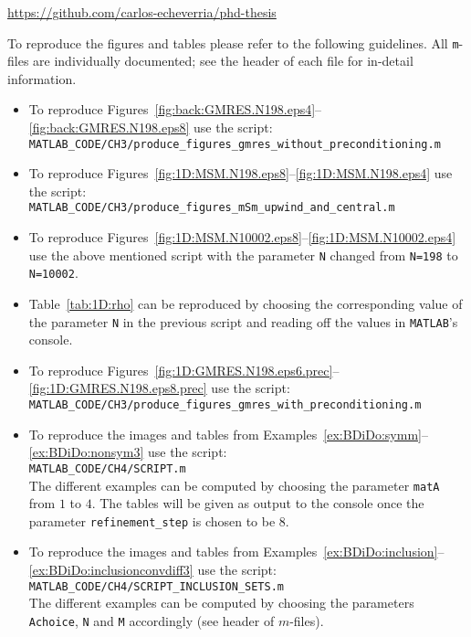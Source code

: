 \documentclass[
  twoside,
  BCOR=12mm,
  openany,
]{scrbook} %
\begin{document}
\begin{center}\url{https://github.com/carlos-echeverria/phd-thesis} \end{center}

\noindent To reproduce the figures and tables please refer to the following guidelines. All \texttt{m}-files are individually documented; see the header of each file for in-detail information.
\begin{itemize}
\item To reproduce Figures~\ref{fig:back:GMRES.N198.eps4}--\ref{fig:back:GMRES.N198.eps8} use the script:\\
\medskip
\texttt{MATLAB\_CODE/CH3/produce\_figures\_gmres\_without\_preconditioning.m}
\item To reproduce Figures~\ref{fig:1D:MSM.N198.eps8}--\ref{fig:1D:MSM.N198.eps4} use the script:\\
\medskip
\texttt{MATLAB\_CODE/CH3/produce\_figures\_mSm\_upwind\_and\_central.m}
\item To reproduce Figures~\ref{fig:1D:MSM.N10002.eps8}--\ref{fig:1D:MSM.N10002.eps4} use the above mentioned script with the parameter \texttt{N} changed from \texttt{N=198} to \texttt{N=10002}.
\item Table~\ref{tab:1D:rho} can be reproduced by choosing the corresponding value of the parameter \texttt{N} in the previous script and reading off the values in \texttt{MATLAB}'s console.
\item To reproduce Figures~\ref{fig:1D:GMRES.N198.eps6.prec}--\ref{fig:1D:GMRES.N198.eps8.prec} use the script:\\
\medskip
\texttt{MATLAB\_CODE/CH3/produce\_figures\_gmres\_with\_preconditioning.m}
\item To reproduce the images and tables from Examples~\ref{ex:BDiDo:symm}--\ref{ex:BDiDo:nonsym3} use the script:\\
\medskip
\texttt{MATLAB\_CODE/CH4/SCRIPT.m}\\
The different examples can be computed by choosing the parameter \texttt{matA} from $1$ to $4$. The tables will be given as output to the console once the parameter \texttt{refinement\_step} is chosen to be $8$.
\item To reproduce the images and tables from Examples~\ref{ex:BDiDo:inclusion}--\ref{ex:BDiDo:inclusionconvdiff3} use the script:\\
\medskip
\texttt{MATLAB\_CODE/CH4/SCRIPT\_INCLUSION\_SETS.m}\\
The different examples can be computed by choosing the parameters \texttt{Achoice}, \texttt{N} and \texttt{M} accordingly (see header of $m$-files).

\end{itemize}
\end{document}
